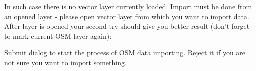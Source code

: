 In such case there is no vector layer currently loaded. Import must be done
from an opened layer - please open vector layer from which you want to import
data. After layer is opened your second try should give you better result
(don't forget to mark current OSM layer again):

Submit dialog to start the process of OSM data importing.
Reject it if you are not sure you want to import something.


